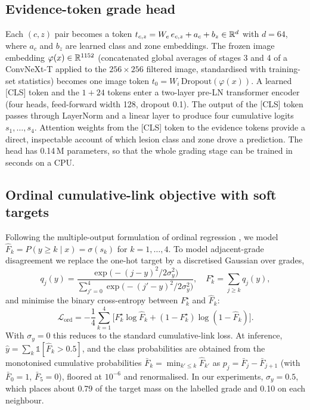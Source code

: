 \subsection{Evidence-token grade head}
\label{sec:head}
Each $(c,z)$ pair becomes a token $t_{c,z}=W_e\,e_{c,z}+a_c+b_z\in\mathbb{R}^d$ with $d=64$, where $a_c$ and $b_z$ are learned class and zone embeddings. The frozen image embedding $\varphi(x)\in\mathbb{R}^{1152}$ (concatenated global averages of stages 3 and 4 of a ConvNeXt-T \citep{liu2022convnext} applied to the $256\times256$ filtered image, standardised with training-set statistics) becomes one image token $t_0=W_i\,\mathrm{Dropout}(\varphi(x))$. A learned [CLS] token and the $1+24$ tokens enter a two-layer pre-LN transformer encoder (four heads, feed-forward width 128, dropout 0.1). The output of the [CLS] token passes through LayerNorm and a linear layer to produce four cumulative logits $s_1,\dots,s_4$. Attention weights from the [CLS] token to the evidence tokens provide a direct, inspectable account of which lesion class and zone drove a prediction. The head has 0.14\,M parameters, so that the whole grading stage can be trained in seconds on a CPU.

\subsection{Ordinal cumulative-link objective with soft targets}
\label{sec:ordinal}
Following the multiple-output formulation of ordinal regression \citep{niu2016ordinal,cao2020coral}, we model $\hat F_k=P(y\ge k\mid x)=\sigma(s_k)$ for $k=1,\dots,4$. To model adjacent-grade disagreement we replace the one-hot target by a discretised Gaussian over grades,
\begin{equation}
q_j(y)=\frac{\exp\!\big(-(j-y)^2/2\sigma_y^2\big)}{\sum_{j'=0}^{4}\exp\!\big(-(j'-y)^2/2\sigma_y^2\big)},\quad
F_k^\star=\sum_{j\ge k}q_j(y),
\label{eq:softlabel}
\end{equation}
and minimise the binary cross-entropy between $F_k^\star$ and $\hat F_k$:
\begin{equation}
\mathcal L_{\mathrm{ord}}=-\frac14\sum_{k=1}^{4}\Big[F^\star_k\log\hat F_k+(1-F^\star_k)\log(1-\hat F_k)\Big].
\label{eq:ord}
\end{equation}
With $\sigma_y=0$ this reduces to the standard cumulative-link loss. At inference, $\hat y=\sum_k\mathbb 1[\hat F_k>0.5]$, and the class probabilities are obtained from the monotonised cumulative probabilities $\bar F_k=\min_{k'\le k}\hat F_{k'}$ as $p_j=\bar F_j-\bar F_{j+1}$ (with $\bar F_0=1$, $\bar F_5=0$), floored at $10^{-6}$ and renormalised. In our experiments, $\sigma_y=0.5$, which places about 0.79 of the target mass on the labelled grade and 0.10 on each neighbour.

